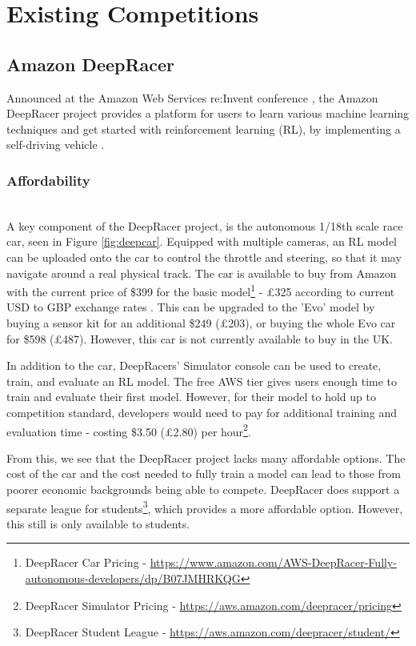 \documentclass{l4proj}
\begin{document}
\section{Existing Competitions}
\subsection{Amazon DeepRacer}\label{sec:deepracer}
Announced at the Amazon Web Services re:Invent conference \citep{DeepracerAnnounced}, the Amazon DeepRacer project provides a platform for users to learn various machine learning techniques and get started with reinforcement learning (RL), by implementing a self-driving vehicle \citep{balaji2020deepracer}.

\subsubsection{Affordability} \hfill \\
A key component of the DeepRacer project, is the autonomous 1/18th scale race car, seen in Figure \ref{fig:deepcar}. Equipped with multiple cameras, an RL model can be uploaded onto the car to control the throttle and steering, so that it may navigate around a real physical track. The car is available to buy from Amazon with the current price of \$399 for the basic model\footnote{DeepRacer Car Pricing - \url{https://www.amazon.com/AWS-DeepRacer-Fully-autonomous-developers/dp/B07JMHRKQG}} - £325 according to current USD to GBP exchange rates \citep{exchangerates}. This can be upgraded to the 'Evo' model by buying a sensor kit for an additional \$249 (£203), or buying the whole Evo car for \$598 (£487). However, this car is not currently available to buy in the UK.

In addition to the car, DeepRacers' Simulator console can be used to create, train, and evaluate an RL model. The free AWS tier gives users enough time to train and evaluate their first model. However, for their model to hold up to competition standard, developers would need to pay for additional training and evaluation time - costing \$3.50 (£2.80) per hour\footnote{DeepRacer Simulator Pricing - \url{https://aws.amazon.com/deepracer/pricing}}.

From this, we see that the DeepRacer project lacks many affordable options. The cost of the car and the cost needed to fully train a model can lead to those from poorer economic backgrounds being able to compete. DeepRacer does support a separate league for students\footnote{DeepRacer Student League - \url{https://aws.amazon.com/deepracer/student/}}, which provides a more affordable option. However, this still is only available to students.
\end{document}
